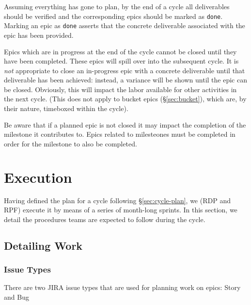 Assuming everything has gone to plan, by the end of a \gls{cycle} all deliverables should be verified and the corresponding \glspl{epic} should be marked as \texttt{done}.
Marking an \gls{epic} as \texttt{done} asserts that the concrete deliverable associated with the \gls{epic} has been provided.

Epics which are in progress at the end of the \gls{cycle} cannot be closed until they have been completed.
These \glspl{epic} will spill over into the subsequent \gls{cycle}.
It is \emph{not} appropriate to close an in-progress \gls{epic} with a concrete deliverable until that deliverable has been achieved: instead, a variance will be shown until the \gls{epic} can be closed.
Obviously, this will impact the labor available for other activities in the next \gls{cycle}.
(This does not apply to bucket \glspl{epic} (\S\ref{sec:bucket}), which are, by their nature, \gls{timebox}ed within the \gls{cycle}).

Be aware that if a planned \gls{epic} is not closed it may impact the completion of the milestone it contributes to.  Epics related to milesteones must be completed in order for the milestone to also be completed.


\section{Execution} \label{sec:execution}

Having defined the plan for a \gls{cycle} following \S\ref{sec:cycle-plan}, we (\gls{RDP} and \gls{RPF}) execute it by means of a series of month-long sprints.
In this section, we detail the procedures teams are expected to follow during the \gls{cycle}.

\subsection{Detailing Work}
\label{sec:detailing-work}

\subsubsection{Issue Types}\label{issue-types}

There are two \gls{JIRA} issue types that are used for planning work on epics: Story and Bug

